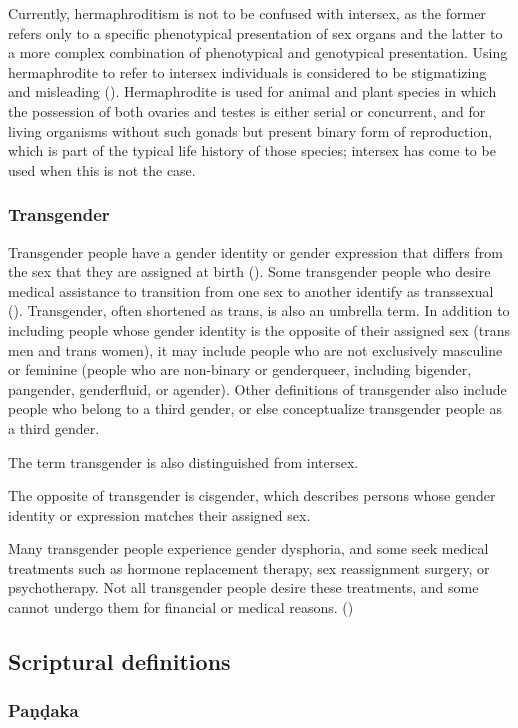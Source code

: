 Currently, hermaphroditism is not to be confused with intersex, as the former refers only to a specific phenotypical presentation of sex organs and the latter to a more complex combination of phenotypical and genotypical presentation. Using hermaphrodite to refer to intersex individuals is considered to be stigmatizing and misleading (\cite{is2013}). Hermaphrodite is used for animal and plant species in which the possession of both ovaries and testes is either serial or concurrent, and for living organisms without such gonads but present binary form of reproduction, which is part of the typical life history of those species; intersex has come to be used when this is not the case.


\subsubsection{Transgender}
Transgender people have a gender identity or gender expression that differs from the sex that they are assigned at birth (\cite{altilio}). Some transgender people who desire medical assistance to transition from one sex to another identify as transsexual (\cite{polly}). Transgender, often shortened as trans, is also an umbrella term. In addition to including people whose gender identity is the opposite of their assigned sex (trans men and trans women), it may include people who are not exclusively masculine or feminine (people who are non-binary or genderqueer, including bigender, pangender, genderfluid, or agender). Other definitions of transgender also include people who belong to a third gender, or else conceptualize transgender people as a third gender.

The term transgender is also distinguished from intersex. 

The opposite of transgender is cisgender, which describes persons whose gender identity or expression matches their assigned sex.

Many transgender people experience gender dysphoria, and some seek medical treatments such as hormone replacement therapy, sex reassignment surgery, or psychotherapy. Not all transgender people desire these treatments, and some cannot undergo them for financial or medical reasons. (\cite{maizes})


\subsection{Scriptural definitions}

\subsubsection{Paṇḍaka}

